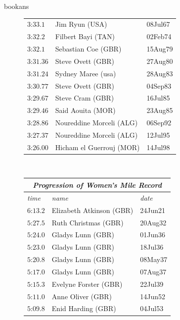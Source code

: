 \begin{exercises}
\begin{Filesave}{bookans}
\begin{figure}
{{\begin{tabular}[t]{|l|ll|}
         $\text{3:33}.1$   &Jim Ryun (USA)         &08Jul67  \\
         $\text{3:32}.2$   &Filbert Bayi (TAN)     &02Feb74  \\
         $\text{3:32}.1$   &Sebastian Coe (GBR)    &15Aug79  \\
         $\text{3:31}.36$  &Steve Ovett (GBR)      &27Aug80  \\
         $\text{3:31}.24$  &Sydney Maree (usa)     &28Aug83  \\
         $\text{3:30}.77$  &Steve Ovett (GBR)      &04Sep83  \\
         $\text{3:29}.67$  &Steve Cram (GBR)       &16Jul85  \\
         $\text{3:29}.46$  &Said Aouita (MOR)      &23Aug85  \\ 
         $\text{3:28}.86$  &Noureddine Morceli (ALG)  &06Sep92  \\
         $\text{3:27}.37$  &Noureddine Morceli (ALG)  &12Jul95  \\
         $\text{3:26}.00$  &Hicham el Guerrouj (MOR)  &14Jul98  \\
     \hline
     \end{tabular}
      \   %
        \begin{tabular}[t]{|l|ll|}
        \hline
          \multicolumn{3}{|c|}{\textit{Progression of Women's Mile Record}}  \\
        \hline
        \textit{time}  &\textit{name}  &\textit{date}  \\
         \hline  
           $\text{6:13}.2$    &Elizabeth Atkinson (GBR)    &24Jun21 \\
           $\text{5:27}.5$    &Ruth Christmas (GBR)        &20Aug32 \\
           $\text{5:24}.0$    &Gladys Lunn (GBR)           &01Jun36 \\
           $\text{5:23}.0$    &Gladys Lunn (GBR)           &18Jul36 \\
           $\text{5:20}.8$    &Gladys Lunn (GBR)           &08May37 \\
           $\text{5:17}.0$    &Gladys Lunn (GBR)           &07Aug37 \\
           $\text{5:15}.3$    &Evelyne Forster (GBR)       &22Jul39 \\
           $\text{5:11}.0$    &Anne Oliver (GBR)           &14Jun52 \\
           $\text{5:09}.8$    &Enid Harding (GBR)          &04Jul53 \\

\end{tabular}}}
\end{figure}
\end{Filesave}
\end{exercises}
